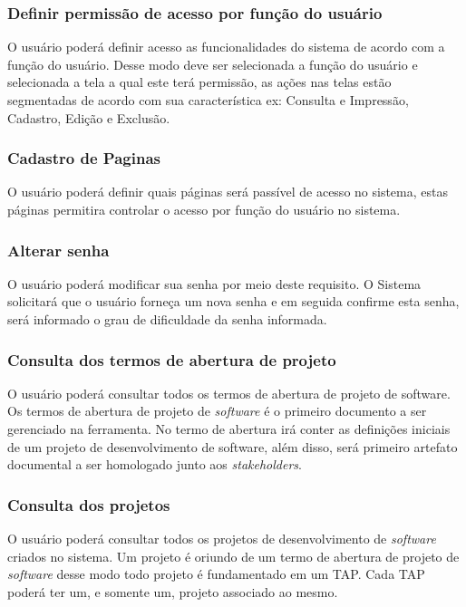 \documentclass{acm_proc_article-sp}
\begin{document}
\subsubsection{Definir permissão de acesso por função do usuário}
O usuário poderá definir acesso as funcionalidades do sistema de acordo com a função do usuário. Desse modo deve ser selecionada a função do usuário e selecionada a tela a qual este terá permissão, as ações nas telas estão segmentadas de acordo com sua característica ex: Consulta e Impressão, Cadastro, Edição e Exclusão. 

\subsubsection{Cadastro de Paginas}
O usuário poderá definir quais páginas será passível de acesso no sistema, estas páginas permitira controlar o acesso por função do usuário no sistema.

\subsubsection{Alterar senha}
O usuário poderá modificar sua senha por meio deste requisito. O Sistema solicitará que o usuário forneça um nova senha e em seguida confirme esta senha, será informado o grau de dificuldade da senha informada.

\subsubsection{Consulta dos termos de abertura de projeto}
O usuário poderá consultar todos os termos de abertura de projeto de software. Os termos de abertura de projeto de \textit{software} é o primeiro documento a ser gerenciado na ferramenta. No termo de abertura irá conter as definições iniciais de um projeto de desenvolvimento de software, além disso, será primeiro artefato documental a ser homologado junto aos \textit{stakeholders}.

\subsubsection{Consulta dos projetos}
O usuário poderá consultar todos os projetos de desenvolvimento de \textit{software} criados no sistema. Um projeto é oriundo de um termo de abertura de projeto de \textit{software} desse modo todo projeto é fundamentado em um TAP. Cada TAP poderá ter um, e somente um, projeto associado ao mesmo.
\end{document}
